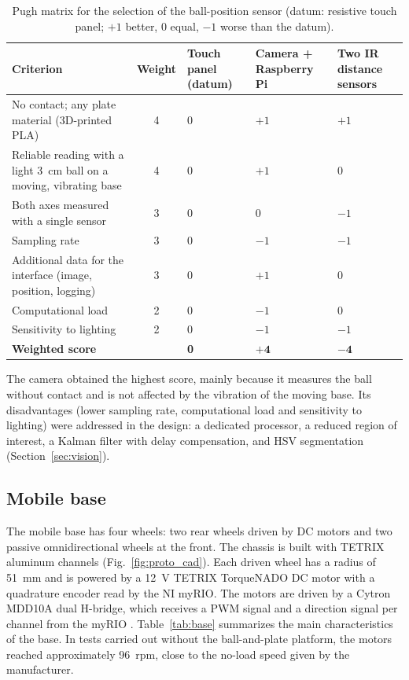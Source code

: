 \documentclass[11pt,letterpaper]{article}
\begin{document}
\begin{table}[H]
\centering
\caption{Pugh matrix for the selection of the ball-position sensor
(datum: resistive touch panel; $+1$ better, $0$ equal, $-1$ worse than
the datum).}
\label{tab:pugh}
\small
\begin{tabularx}{\textwidth}{@{}L{6.6cm}cYYY@{}}
\toprule
\textbf{Criterion} & \textbf{Weight} & \textbf{Touch panel (datum)} & \textbf{Camera + Raspberry Pi} & \textbf{Two IR distance sensors} \\
\midrule
No contact; any plate material (3D-printed PLA) & 4 & 0 & $+1$ & $+1$ \\
Reliable reading with a light 3~cm ball on a moving, vibrating base & 4 & 0 & $+1$ & $0$ \\
Both axes measured with a single sensor & 3 & 0 & $0$ & $-1$ \\
Sampling rate & 3 & 0 & $-1$ & $-1$ \\
Additional data for the interface (image, position, logging) & 3 & 0 & $+1$ & $0$ \\
Computational load & 2 & 0 & $-1$ & $0$ \\
Sensitivity to lighting & 2 & 0 & $-1$ & $-1$ \\
\midrule
\textbf{Weighted score} & & \textbf{0} & $\mathbf{+4}$ & $\mathbf{-4}$ \\
\bottomrule
\end{tabularx}
\end{table}

The camera obtained the highest score, mainly because it measures the
ball without contact and is not affected by the vibration of the moving
base. Its disadvantages (lower sampling rate, computational load and
sensitivity to lighting) were addressed in the design: a dedicated
processor, a reduced region of interest, a Kalman filter with delay
compensation, and HSV segmentation (Section~\ref{sec:vision}).

\subsection{Mobile base}
The mobile base has four wheels: two rear wheels driven by DC motors and
two passive omnidirectional wheels at the front. The chassis is built
with TETRIX aluminum channels (Fig.~\ref{fig:proto_cad}). Each driven
wheel has a radius of 51~mm and is powered by a 12~V TETRIX
TorqueNADO DC motor with a quadrature encoder read by the NI myRIO. The
motors are driven by a Cytron MDD10A dual H-bridge, which receives a PWM
signal and a direction signal per channel from the myRIO
\cite{MDD10A,myRIO}. Table~\ref{tab:base} summarizes the main
characteristics of the base. In tests carried out without the
ball-and-plate platform, the motors reached approximately 96~rpm, close
to the no-load speed given by the manufacturer.
\end{document}
